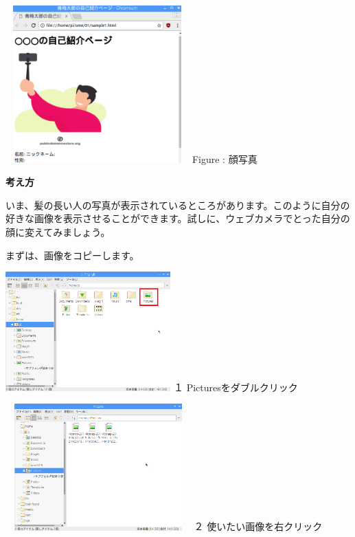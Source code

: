 \documentclass[a4paper,12pt]{jarticle}
\begin{document}
\centering
\begin{minipage}{6.738cm}
  {\upshape
    \includegraphics[width=7.071cm,height=6.048cm]{textbook-img161.png}
    \newline
    Figure : 顔写真}
\end{minipage}

\flushleft
\textbf{考え方}


いま、髪の長い人の写真が表示されているところがあります。このように自分の好きな画像を表示させることができます。試しに、ウェブカメラでとった自分の顔に変えてみましょう。

まずは、画像をコピーします。


\bigskip

\begin{minipage}{6.377cm}
  \includegraphics[width=6.359cm,height=4.597cm]{textbook-img164.png}
  \newline
  １ Picturesをダブルクリック
\end{minipage}
\hspace{10mm}
\begin{minipage}{7.465cm}
  \includegraphics[width=7.142cm,height=4.873cm]{textbook-img162.png}
  \newline
  ２ 使いたい画像を右クリック
\end{minipage}
\end{document}
